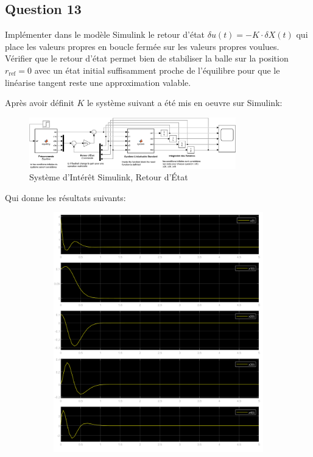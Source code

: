 \documentclass[class=article, crop=false]{standalone}
\begin{document}
\subsection{Question 13}
\begin{exercise}
    Implémenter dans le modèle Simulink le retour d'état  $\delta u(t) = -K \cdot \delta X(t)$ qui place les valeurs propres en boucle fermée sur les valeurs propres voulues.\\
    
Vérifier que le retour d'état permet bien de stabiliser la balle sur la position $r_{\text{ref}} = 0$ avec un état initial suffisamment proche de l'équilibre pour que le linéarise tangent reste une approximation valable.
\end{exercise}
\begin{resolution}
    Après avoir définit $K$ le système suivant a été mis en oeuvre sur Simulink:
    \begin{figure}[H]
        \centering
        \includegraphics[width=0.8\textwidth]{../images/system_simulink_3.png}
        \caption{Système d'Intérêt Simulink, Retour d'État}
    \end{figure}
    Qui donne les résultats suivants:
    \begin{figure}[H]
        \centering
        \begin{subfigure}[b]{0.475\textwidth}
            \centering
            \includegraphics[width=\textwidth]{../images/simulink_scope3_0_01.png}

\end{subfigure}
\end{figure}
\end{resolution}
\end{document}

